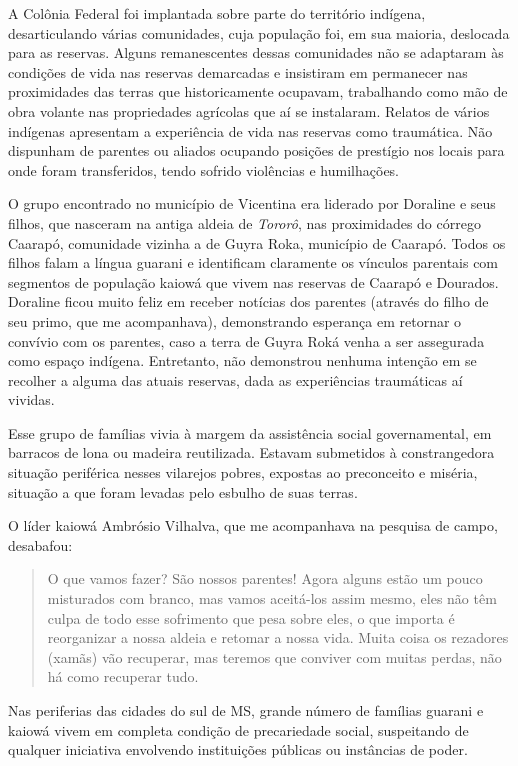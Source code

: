 A Colônia Federal foi implantada sobre parte do território indígena,
desarticulando várias comunidades, cuja população foi, em sua maioria,
deslocada para as reservas. Alguns remanescentes dessas comunidades não
se adaptaram às condições de vida nas reservas demarcadas e insistiram
em permanecer nas proximidades das terras que historicamente ocupavam,
trabalhando como mão de obra volante nas propriedades agrícolas que aí
se instalaram. Relatos de vários indígenas apresentam a experiência de
vida nas reservas como traumática. Não dispunham de parentes ou aliados
ocupando posições de prestígio nos locais para onde foram transferidos,
tendo sofrido violências e humilhações.

O grupo encontrado no município de Vicentina era liderado por Doraline e
seus filhos, que nasceram na antiga aldeia de \emph{Tororô}, nas
proximidades do córrego Caarapó, comunidade vizinha a de Guyra Roka,
município de Caarapó. Todos os filhos falam a língua guarani e
identificam claramente os vínculos parentais com segmentos de população
kaiowá que vivem nas reservas de Caarapó e Dourados. Doraline ficou
muito feliz em receber notícias dos parentes (através do filho de seu
primo, que me acompanhava), demonstrando esperança em retornar o
convívio com os parentes, caso a terra de Guyra Roká venha a ser
assegurada como espaço indígena. Entretanto, não demonstrou nenhuma
intenção em se recolher a alguma das atuais reservas, dada as
experiências traumáticas aí vividas.

Esse grupo de famílias vivia à margem da assistência social
governamental, em barracos de lona ou madeira reutilizada. Estavam
submetidos à constrangedora situação periférica nesses vilarejos pobres,
expostas ao preconceito e miséria, situação a que foram levadas pelo
esbulho de suas terras.

O líder kaiowá Ambrósio Vilhalva, que me acompanhava na pesquisa de
campo, desabafou:

\begin{quote}
O que vamos fazer? São nossos parentes! Agora alguns estão um pouco
misturados com branco, mas vamos aceitá-los assim mesmo, eles não têm
culpa de todo esse sofrimento que pesa sobre eles, o que importa é
reorganizar a nossa aldeia e retomar a nossa vida. Muita coisa os
rezadores (xamãs) vão recuperar, mas teremos que conviver com muitas
perdas, não há como recuperar tudo.
\end{quote}

Nas periferias das cidades do sul de MS, grande número de famílias
guarani e kaiowá vivem em completa condição de precariedade social,
suspeitando de qualquer iniciativa envolvendo instituições públicas ou
instâncias de poder.

